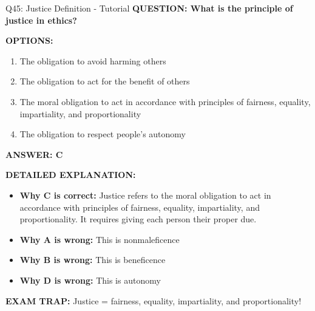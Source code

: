 \documentclass[8pt]{beamer}
\begin{document}
	\begin{frame}{Q45: Justice Definition - Tutorial}
		\fontsize{6.5}{7.5}\selectfont
		\textbf{QUESTION: What is the principle of justice in ethics?}
		
		\vspace{0.1cm}
		\textbf{OPTIONS:}
		\begin{enumerate}
			\item The obligation to avoid harming others
			\item The obligation to act for the benefit of others
			\item The moral obligation to act in accordance with principles of fairness, equality, impartiality, and proportionality
			\item The obligation to respect people's autonomy
		\end{enumerate}
		
		\vspace{0.1cm}
		\textcolor{myblue}{\textbf{ANSWER: C}}
		
		\vspace{0.1cm}
		\textbf{DETAILED EXPLANATION:}
		\begin{itemize}
			\item \textbf{Why C is correct:} Justice refers to the moral obligation to act in accordance with principles of fairness, equality, impartiality, and proportionality. It requires giving each person their proper due.
			\item \textbf{Why A is wrong:} This is nonmaleficence
			\item \textbf{Why B is wrong:} This is beneficence
			\item \textbf{Why D is wrong:} This is autonomy
		\end{itemize}
		
		\textcolor{myred}{\textbf{EXAM TRAP:}} Justice = \textcolor{myblue}{fairness, equality, impartiality, and proportionality}!
	\end{frame}
	
\end{document}
